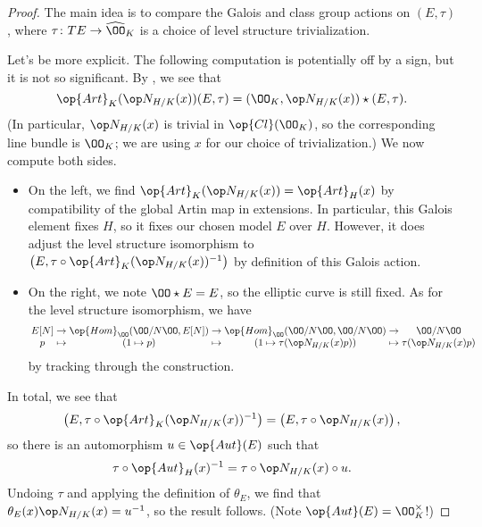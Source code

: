 \documentclass[../notes.tex]{subfiles}
\begin{document}
\begin{proof}
	The main idea is to compare the Galois and class group actions on $(E,\tau)$, where $\tau\colon TE\to\widehat\OO_K$ is a choice of level structure trivialization.

	Let's be more explicit. The following computation is potentially off by a sign, but it is not so significant. By , we see that
	\[\op{Art}_K(\op N_{H/K}(x))(E,\tau)=(\OO_K,\op N_{H/K}(x))\star(E,\tau).\]
	(In particular, $\op N_{H/K}(x)$ is trivial in $\op{Cl}(\OO_K)$, so the corresponding line bundle is $\OO_K$; we are using $x$ for our choice of trivialization.) We now compute both sides.
	\begin{itemize}
		\item On the left, we find $\op{Art}_K(\op N_{H/K}(x))=\op{Art}_H(x)$ by compatibility of the global Artin map in extensions. In particular, this Galois element fixes $H$, so it fixes our chosen model $E$ over $H$. However, it does adjust the level structure isomorphism to $\left(E,\tau\circ\op{Art}_K(\op N_{H/K}(x))^{-1}\right)$ by definition of this Galois action.
		\item On the right, we note $\OO\star E=E$, so the elliptic curve is still fixed. As for the level structure isomorphism, we have
		\[\arraycolsep=1.4pt\begin{array}{cccccccccc}
			E[N] &\to& \op{Hom}_\OO(\OO/N\OO,E[N]) &\to& \op{Hom}_\OO(\OO/N\OO,\OO/N\OO) &\to& \OO/N\OO \\
			p &\mapsto& (1\mapsto p) &\mapsto& (1\mapsto\tau(\op N_{H/K}(x)p)) &\mapsto& \tau(\op N_{H/K}(x)p)
		\end{array}\]
		by tracking through the construction.
	\end{itemize}
	In total, we see that
	\[\left(E,\tau\circ\op{Art}_K(\op N_{H/K}(x))^{-1}\right)=\left(E,\tau\circ\op N_{H/K}(x)\right),\]
	so there is an automorphism $u\in\op{Aut}(E)$ such that
	\[\tau\circ\op{Aut}_H(x)^{-1}=\tau\circ\op N_{H/K}(x)\circ u.\]
	Undoing $\tau$ and applying the definition of $\theta_E$, we find that $\theta_E(x)\op N_{H/K}(x)=u^{-1}$, so the result follows. (Note $\op{Aut}(E)=\OO_K^\times$!)
\end{proof}
\end{document}
